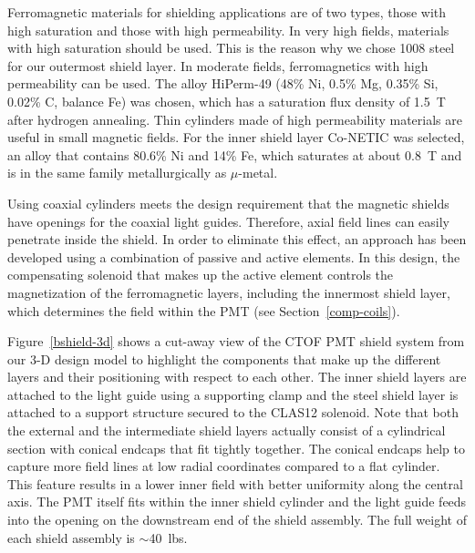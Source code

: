 \documentclass{elsart}
\begin{document}
Ferromagnetic materials for shielding applications are of two types, those with high saturation
and those with high permeability. In very high fields, materials with high saturation should
be used. This is the reason why we chose 1008 steel for our outermost shield layer. In moderate
fields, ferromagnetics with high permeability can be used. The alloy HiPerm-49 (48\% Ni, 0.5\%
Mg, 0.35\% Si, 0.02\% C, balance Fe) was chosen, which has a saturation flux density of 1.5~T
after hydrogen annealing. Thin cylinders made of high permeability materials are useful in small
magnetic fields. For the inner shield layer Co-NETIC was selected, an alloy that contains 80.6\%
Ni and 14\% Fe, which saturates at about 0.8~T and is in the same family metallurgically as
$\mu$-metal.

Using coaxial cylinders meets the design requirement that the magnetic shields have openings 
for the coaxial light guides. Therefore, axial field lines can easily penetrate inside the 
shield. In order to eliminate this effect, an approach has been developed using a 
combination of passive and active elements. In this design, the compensating solenoid that 
makes up the active element controls the magnetization of the ferromagnetic layers, including 
the innermost shield layer, which determines the field within the PMT (see 
Section~\ref{comp-coils}).

Figure~\ref{bshield-3d} shows a cut-away view of the CTOF PMT shield system from our 3-D design 
model to highlight the components that make up the different layers and their positioning with 
respect to each other. The inner shield layers are attached to the light guide using a 
supporting clamp and the steel shield layer is attached to a support structure secured to the 
CLAS12 solenoid. Note that both the external and the intermediate shield layers actually 
consist of a cylindrical section with conical endcaps that fit tightly together. The conical 
endcaps help to capture more field lines at low radial coordinates compared to a flat cylinder. 
This feature results in a lower inner field with better uniformity along the central axis. The 
PMT itself fits within the inner shield cylinder and the light guide feeds into the opening on 
the downstream end of the shield assembly. The full weight of each shield assembly is 
$\sim$40~lbs.
\end{document}
